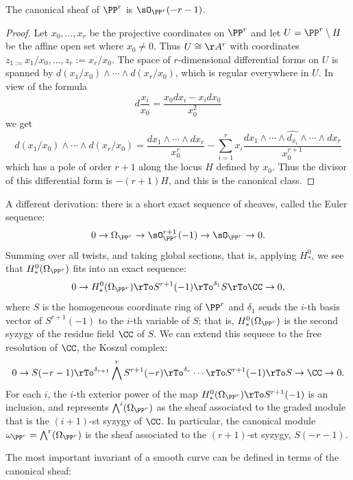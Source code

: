 \begin{theorem}
 The canonical sheaf of $\PP^{r}$ is $\sO_{\PP^{r}}(-r-1)$. 
\end{theorem}
\begin{proof}
Let $x_{0}, \dots, x_{r}$ be the projective coordinates on $\PP^{r}$ and let  $U = \PP^{r}\setminus H$ be the affine open set where $x_{0} \neq 0$. Thus $U \cong \AA^{r}$ with coordinates $z_{1 := }x_{1}/x_{0}, \dots, z_{r}:=x_{r}/x_{0}$. The space of $r$-dimensional differential forms on $U$ is spanned by $d(x_{1}/x_{0})\wedge\cdots\wedge d(x_{r}/x_{0})$, which is regular everywhere in $U$. In view of the formula
$$
d\frac{x_{i}}{x_{0}} = \frac{x_{0}dx_{i}-x_{i}dx_{0}}{x_{0}^{2}}
$$
we get
$$
d(x_{1}/x_{0})\wedge\cdots\wedge d(x_{r}/x_{0}) = \frac{dx_{1}\wedge\cdots\wedge dx_{r}}{x_{0}^{r}}-
\sum_{i=1}^{r} x_{i} \frac{ dx_{1}\wedge\cdots \wedge \widehat{d_{x_{i}}}\wedge \cdots \wedge dx_{r}}{x_{0}^{r+1}}
$$
which has a pole of order $r+1$ along the locus $H$ defined by $x_{0}$. Thus the divisor of this differential form
is $-(r+1)H$, and this is the canonical class.
\end{proof}

\begin{fact}
A different derivation: there is a short exact sequence of sheaves, called the Euler sequence:
$$
0\to \Omega_{\PP^{r}} \to \sO_{\PP^{r}}^{r+1} (-1) \to \sO_{\PP^{r}} \to 0.
$$
Summing over all twists, and taking global sections, that is, applying $H^0_*$, we see that 
$H^0_*(\Omega_{\PP^{r}})$ fits into an exact sequence:
$$
0 \to H^0_*(\Omega_{\PP^{r}}) \rTo S^{r+1}(-1) \rTo^{\delta_{1}} S \rTo \CC \to 0,
$$
where $S$ is the homogeneous coordinate ring of $\PP^r$ and $\delta_1$ sends the $i$-th basis vector of
$S^{r+1}(-1)$ to the $i$-th variable of $S$; that is, $H^0_*(\Omega_{\PP^{r}})$ is the second syzygy of the residue field $\CC$ of $S$. We can extend this sequece to  the free resolution
of $\CC$, the Koszul complex:
$$
0 \to S(-r-1) \rTo^{\delta_{r+1}} \bigwedge^rS^{r+1}(-r) \rTo^{\delta_{r}} \cdots \rTo S^{r+1}(-1) \rTo S \to \CC \to 0.
$$
For each $i$, the $i$-th exterior power of the map $H^0_*(\Omega_{\PP^{r}}) \rTo S^{r+1}(-1)$ is an inclusion, and
represents $\bigwedge^i(\Omega_{\PP^{r}})$ as the sheaf associated to the graded module that is the $(i+1)$-st syzygy of $\CC$.
In particular, the canonical module $\omega_{\PP^r} = \bigwedge^r(\Omega_{\PP^{r}})$ is the sheaf associated to the 
$(r+1)$-st syzygy, $S(-r-1)$.
\end{fact}

The most important invariant of a smooth curve can be defined in terms of the canonical sheaf:

